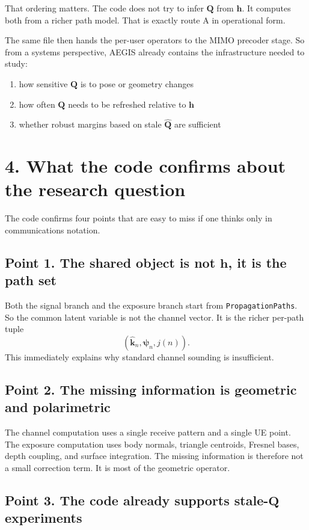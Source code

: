 \documentclass[11pt]{article}
\newcommand{\hh}{\mathbf{h}}
\newcommand{\QQ}{\mathbf{Q}}
\begin{document}
That ordering matters. The code does not try to infer $\QQ$ from $\hh$. It
computes both from a richer path model. That is exactly route A in operational
form.

The same file then hands the per-user operators to the MIMO precoder stage.
So from a systems perspective, AEGIS already contains the infrastructure
needed to study:
\begin{enumerate}
  \item how sensitive $\QQ$ is to pose or geometry changes
  \item how often $\QQ$ needs to be refreshed relative to $\hh$
  \item whether robust margins based on stale $\widehat{\QQ}$ are sufficient
\end{enumerate}

\section*{4. What the code confirms about the research question}

The code confirms four points that are easy to miss if one thinks only in
communications notation.

\subsection*{Point 1. The shared object is not $\hh$, it is the path set}

Both the signal branch and the exposure branch start from
\texttt{PropagationPaths}. So the common latent variable is not the channel
vector. It is the richer per-path tuple
\[
  (\hat{\mathbf{k}}_n,\boldsymbol{\psi}_n,j(n)).
\]
This immediately explains why standard channel sounding is insufficient.

\subsection*{Point 2. The missing information is geometric and polarimetric}

The channel computation uses a single receive pattern and a single UE point.
The exposure computation uses body normals, triangle centroids, Fresnel bases,
depth coupling, and surface integration. The missing information is therefore
not a small correction term. It is most of the geometric operator.

\subsection*{Point 3. The code already supports stale-$\QQ$ experiments}
\end{document}
